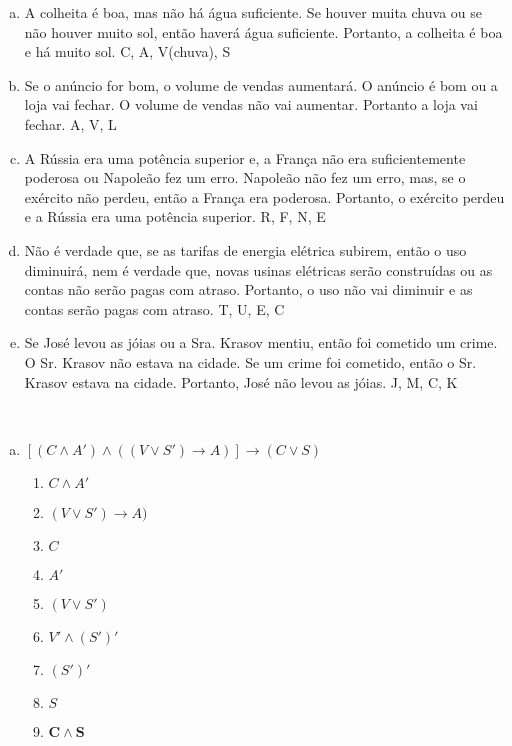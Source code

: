 \documentclass[a4paper, 12pt, addpoints]{exam}
\begin{document}
\begin{questions}
  \begin{enumerate}[a)]
    \item A colheita é boa, mas não há água suficiente. Se houver muita chuva ou se não
          houver muito sol, então haverá água suficiente. Portanto, a colheita é boa e há muito
          sol. C, A, V(chuva), S
    \item Se o anúncio for bom, o volume de vendas aumentará. O anúncio é bom ou a loja
          vai fechar. O volume de vendas não vai aumentar. Portanto a loja vai fechar. A, V, L
    \item A Rússia era uma potência superior e, a França não era suficientemente poderosa
          ou Napoleão fez um erro. Napoleão não fez um erro, mas, se o exército não perdeu,
          então a França era poderosa. Portanto, o exército perdeu e a Rússia era uma potência
          superior. R, F, N, E
    \item Não é verdade que, se as tarifas de energia elétrica subirem, então o uso diminuirá,
          nem é verdade que, novas usinas elétricas serão construídas ou as contas não serão
          pagas com atraso. Portanto, o uso não vai diminuir e as contas serão pagas com atraso.
          T, U, E, C
    \item Se José levou as jóias ou a Sra. Krasov mentiu, então foi cometido um crime. O Sr.
          Krasov não estava na cidade. Se um crime foi cometido, então o Sr. Krasov estava na
          cidade. Portanto, José não levou as jóias. J, M, C, K
  \end{enumerate}

  \begin{resp}~
    \begin{enumerate}[a)]
      \item $[(C \land A') \land ((V \lor S') \rightarrow A)] \rightarrow (C \lor S)$ \\
      \begin{multicols}{2}

        \begin{enumerate}[1.]
          \item $C \land A'$
          \item $(V \lor S') \rightarrow A)$
          \item $C$
          \item $A'$
          \item $(V \lor S')$
          \item $V' \land (S')'$
          \item $(S')'$
          \item $S$
          \item $\boldsymbol{C \land S}$
        \end{enumerate}
        

\end{multicols}
\end{enumerate}
\end{resp}
\end{questions}
\end{document}
